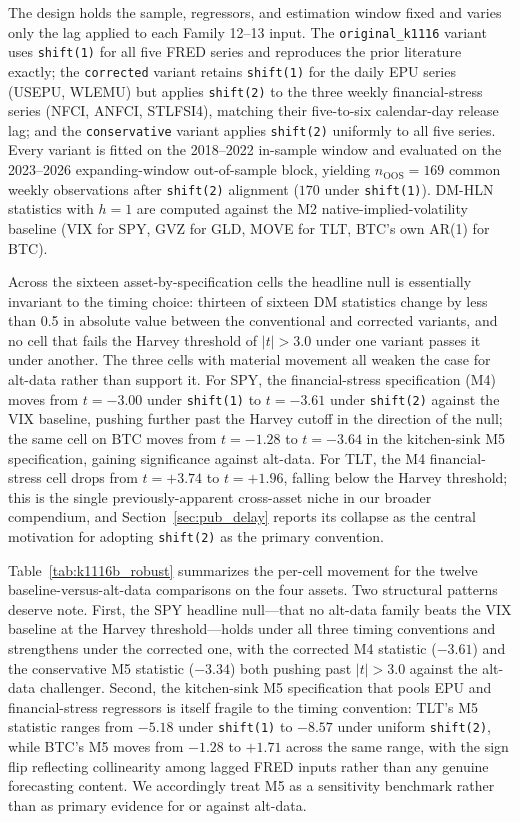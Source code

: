 \documentclass[12pt,a4paper]{article}
\begin{document}
The design holds the sample, regressors, and estimation window fixed and varies only the lag applied to each Family 12--13 input. The \texttt{original\_k1116} variant uses \texttt{shift(1)} for all five FRED series and reproduces the prior literature exactly; the \texttt{corrected} variant retains \texttt{shift(1)} for the daily EPU series (USEPU, WLEMU) but applies \texttt{shift(2)} to the three weekly financial-stress series (NFCI, ANFCI, STLFSI4), matching their five-to-six calendar-day release lag; and the \texttt{conservative} variant applies \texttt{shift(2)} uniformly to all five series. Every variant is fitted on the 2018--2022 in-sample window and evaluated on the 2023--2026 expanding-window out-of-sample block, yielding $n_{\text{OOS}} = 169$ common weekly observations after \texttt{shift(2)} alignment ($170$ under \texttt{shift(1)}). DM-HLN statistics \citep{diebold1995} with $h=1$ are computed against the M2 native-implied-volatility baseline (VIX for SPY, GVZ for GLD, MOVE for TLT, BTC's own AR(1) for BTC).

Across the sixteen asset-by-specification cells the headline null is essentially invariant to the timing choice: thirteen of sixteen DM statistics change by less than 0.5 in absolute value between the conventional and corrected variants, and no cell that fails the Harvey threshold of $|t|>3.0$ under one variant passes it under another. The three cells with material movement all weaken the case for alt-data rather than support it. For SPY, the financial-stress specification (M4) moves from $t=-3.00$ under \texttt{shift(1)} to $t=-3.61$ under \texttt{shift(2)} against the VIX baseline, pushing further past the Harvey cutoff in the direction of the null; the same cell on BTC moves from $t=-1.28$ to $t=-3.64$ in the kitchen-sink M5 specification, gaining significance against alt-data. For TLT, the M4 financial-stress cell drops from $t=+3.74$ to $t=+1.96$, falling below the Harvey threshold; this is the single previously-apparent cross-asset niche in our broader compendium, and Section~\ref{sec:pub_delay} reports its collapse as the central motivation for adopting \texttt{shift(2)} as the primary convention.

Table~\ref{tab:k1116b_robust} summarizes the per-cell movement for the twelve baseline-versus-alt-data comparisons on the four assets. Two structural patterns deserve note. First, the SPY headline null---that no alt-data family beats the VIX baseline at the Harvey threshold---holds under all three timing conventions and strengthens under the corrected one, with the corrected M4 statistic ($-3.61$) and the conservative M5 statistic ($-3.34$) both pushing past $|t|>3.0$ against the alt-data challenger. Second, the kitchen-sink M5 specification that pools EPU and financial-stress regressors is itself fragile to the timing convention: TLT's M5 statistic ranges from $-5.18$ under \texttt{shift(1)} to $-8.57$ under uniform \texttt{shift(2)}, while BTC's M5 moves from $-1.28$ to $+1.71$ across the same range, with the sign flip reflecting collinearity among lagged FRED inputs rather than any genuine forecasting content. We accordingly treat M5 as a sensitivity benchmark rather than as primary evidence for or against alt-data.
\end{document}
